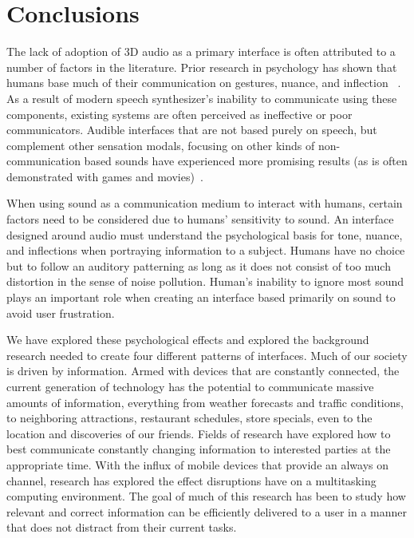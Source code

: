 \newpage                                                  \chapter{Conclusions}

The lack of adoption of 3D audio as a primary interface is often attributed to a
number of factors in the literature. Prior research in psychology has shown that
humans base much of their communication on gestures, nuance, and inflection
~\cite{thackara2005bubble}. As a result of modern speech synthesizer's inability
to communicate using these components, existing systems are often perceived as
ineffective or poor communicators. Audible interfaces that are not based purely
on speech, but complement other sensation modals, focusing on other kinds of
non-communication based sounds have experienced more promising results (as is
often demonstrated with games and movies)~\cite{thackara2005bubble}.

When using sound as a communication medium to interact with humans, certain
factors need to be considered due to humans’ sensitivity to sound. An interface
designed around audio must understand the psychological basis for tone, nuance,
and inflections when portraying information to a subject. Humans have no choice
but to follow an auditory patterning as long as it does not consist of too much
distortion in the sense of noise pollution. Human’s inability to ignore most
sound plays an important role when creating an interface based primarily on
sound to avoid user frustration.

We have explored these psychological effects and explored the background
research needed to create four different patterns of interfaces.  Much of our
society is driven by information. Armed with devices that are constantly
connected, the current generation of technology has the potential to communicate
massive amounts of information, everything from weather forecasts and traffic
conditions, to neighboring attractions, restaurant schedules, store specials,
even to the location and discoveries of our friends. Fields of research have
explored how to best communicate constantly changing information to interested
parties at the appropriate time.  With the influx of mobile devices that provide
an always on channel, research has explored the effect disruptions have on a
multitasking computing environment. The goal of much of this research has been
to study how relevant and correct information can be efficiently delivered to a
user in a manner that does not distract from their current
tasks\cite{McCrickard2003509}.


